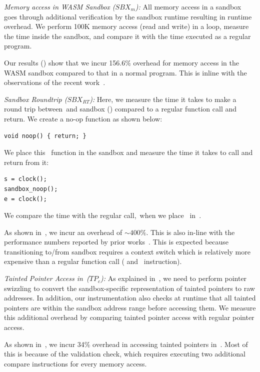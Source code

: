 \noindent\emph{Memory access in WASM Sandbox ($SBX_{m}$):} 
All memory access in a sandbox goes through additional verification by the sandbox runtime resulting in runtime overhead.
We perform 100K memory access (read and write) in a loop, measure the time inside the sandbox, and compare it with the time executed as a regular program.

Our results () show that we incur 156.6\% overhead for memory access in the WASM sandbox compared to that in a normal program.
This is inline with the observations of the recent work~\cite{jangda2019not}.

\noindent\emph{Sandbox Roundtrip ($SBX_{RT}$):}
Here, we measure the time it takes to make a round trip between~\cregion and sandbox (\ucregion) compared to a regular function call and return.
We create a no-op function as shown below:
\begin{verbatim}
void noop() { return; }
\end{verbatim}
We place this~ function in the sandbox and measure the time it takes to call and return from it:
\begin{verbatim}
s = clock();
sandbox_noop();
e = clock();
\end{verbatim}
We compare the time with the regular call,~\ie when we place~ in~\cregion.

As shown in~, we incur an overhead of $\sim 400\%$. This is also in-line with the performance numbers reported by prior works~\cite{jangda2019not, rlbox-paper}.
This is expected because transitioning to/from sandbox requires a context switch which is relatively more expensive than a regular function call (\ie{} and~ instruction).

\noindent\emph{Tainted Pointer Access in~\cregion ($TP_{c}$):}
As explained in~, we need to perform pointer swizzling to convert the sandbox-specific representation of tainted pointers to raw addresses.
In addition, our instrumentation also checks at runtime that all tainted pointers are within the sandbox address range before accessing them.
We measure this additional overhead by comparing tainted pointer access with regular pointer access.

As shown in~, we incur 34\% overhead in accessing tainted pointers in~\cregion.
Most of this is because of the validation check, which requires executing two additional compare instructions for every memory access.

